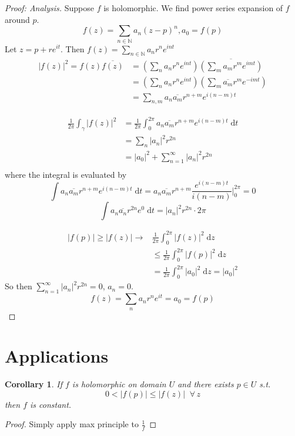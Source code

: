 \documentclass{article}
\newtheorem{corollary}[theorem]{Corollary}
\begin{document}
\begin{proof}[Proof: Analysis]
Suppose $f$ is holomorphic. We find power series expansion of $f$ around $p$.
$$f(z) = \sum_{n \in \mathbb{N}} a_n (z-p)^n, a_0 = f(p)$$
Let $z = p + re^{it}$. Then $f(z) = \sum_{n \in \mathbb{N}} a_n r^n e^{int}$
\begin{equation*}
\begin{split}
|f(z)|^2 = f(z) \overline{f(z)} &= \left( \sum_n a_nr^ne^{int} \right) \overline{\left( \sum_m a_mr^me^{imt} \right)}\\
&= \left( \sum_n a_nr^ne^{int} \right) \left( \sum_m \overline{a_m}r^me^{-imt} \right)\\
&= \sum_{n,m} a_n \overline{a_m} r^{n + m} e^{i(n-m)t}
\end{split}
\end{equation*}

\begin{equation*}
\begin{split}
\frac{1}{2\pi} \int_\gamma |f(z)|^2 &= \frac{1}{2\pi} \int_0^{2\pi} a_n \overline{a_m} r^{n + m} e^{i(n-m)t} \;\mathrm{d}t\\
&= \sum_n |a_n|^2 r^{2n}\\
&= |a_0|^2 + \sum_{n=1}^\infty |a_n|^2 r^{2n}\\
\end{split}
\end{equation*}
where the integral is evaluated by
$$\int a_n \overline{a_m} r^{n + m} e^{i(n-m)t} \;\mathrm{d}t = a_n \overline{a_m} r^{n + m} \frac{e^{i(n-m)t}}{i(n-m)}\Big\vert_0^{2\pi} = 0$$
$$\int a_n \overline{a_n} r^{2n} e^0 \;\mathrm{d}t = |a_n|^2 r^{2n} \cdot 2\pi$$

\begin{equation*}
\begin{split}
|f(p)| \geq |f(z)| \to & \frac{1}{2\pi} \int_0^{2\pi} |f(z)|^2 \;\mathrm{d}z\\
&\leq \frac{1}{2\pi} \int_0^{2\pi} |f(p)|^2 \;\mathrm{d}z\\
&= \frac{1}{2\pi} \int_0^{2\pi} |a_0|^2 \;\mathrm{d}z = |a_0|^2
\end{split}
\end{equation*}
So then $\sum_{n=1}^\infty |a_n|^2 r^{2n} = 0$, $a_n = 0$.
$$f(z) = \sum_n a_nr^ne^{it} = a_0 = f(p)$$
\end{proof}

\section{Applications}
\begin{corollary}
If $f$ is holomorphic on domain $U$ and there exists $p \in U$ s.t.
$$0 < |f(p)| \leq |f(z)| \;\; \forall \, z$$
then $f$ is constant.
\end{corollary}
\begin{proof}
Simply apply max principle to $\frac{1}{f}$
\end{proof}
\end{document}

